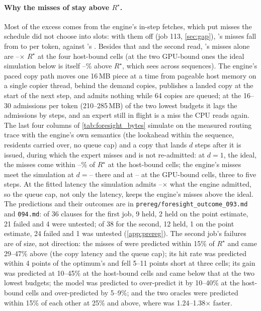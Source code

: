 \paragraph{Why the misses of \MinTwo{} stay above $R^\star$.} Most of the excess comes from the engine's in-step
fetches, which put misses the schedule did not choose into slots: with them off (job 113, \cref{sec:gap}), \FewTwo's
misses fall from \hsMissPlanLowRng{} to \hsMissPlanZeroLowRng{} per token, against \FewOne's \hsMissFewOneLowRng.
Besides that and the second read, \MinTwo's misses alone are
\fsbReadsRatioHostMin--\fsbReadsRatioHostMax$\times$ $R^\star$ at the four host-bound cells (at the two
GPU-bound ones the ideal simulation below is itself \fslIdealOverGpuMin--\fslIdealOverGpuMax\% above $R^\star$,
which sees across sequences). The engine's paced copy path moves one 16\,MB piece at a time from pageable host
memory on a single copier thread, behind the demand copies, publishes a landed copy at the start of the next step, and
admits nothing while 64 copies are queued; at the 16--30 admissions per token (210--285\,MB) of the two lowest
budgets it lags the admissions by steps, and an expert still in flight is a miss the CPU reads again. The last four columns of \cref{tab:foresight_bytes}
simulate \MinTwo{} on the measured routing trace with the engine's own semantics (the lookahead within the
sequence, residents carried over, no queue cap) and a copy that lands $d$ steps after it is issued, during which the
expert misses and is not re-admitted: at $d{=}1$, the ideal, the misses come within
\fslIdealOverMin--\fslIdealOverMax\% of $R^\star$ at the host-bound cells; the engine's misses meet the
simulation at $d{=}$\fslFitHostMin--\fslFitHostMax{} there and at \fslFitGpuMin--\fslFitGpuMax{} at the GPU-bound
cells, three to five steps. At the fitted latency the simulation admits \fsbSimAdmitMin--\fsbSimAdmitMax$\times$ what
the engine admitted, so the queue cap, not only the latency, keeps the engine's misses above the ideal. The predictions and their outcomes are in
\texttt{prereg/foresight\_outcome\_093.md} and \texttt{094.md}: of 36 clauses for the first job, 9 held, 2 held on
the point estimate, 21 failed and 4 were untested; of 38 for the second, 12 held, 1 on the point estimate, 24 failed
and 1 was untested (\cref{app:prereg}). The second job's failures are of size, not direction: the misses of \MinTwo{}
were predicted within 15\% of $R^\star$ and came 29--47\% above (the copy latency and the queue
cap); its hit rate was predicted within 4 points of the optimum's and fell 5--11 points short at three cells; its gain
was predicted at 10--45\% at the host-bound cells and came below that at the two lowest budgets; the model was predicted
to over-predict it by 10--40\% at the host-bound cells and over-predicted by 5--9\%; and the two oracles were
predicted within 15\% of each other at 25\% and above, where  was 1.24--1.38$\times$ faster.

